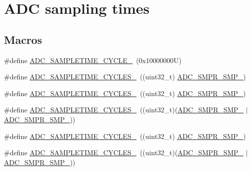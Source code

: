 \hypertarget{group___a_d_c__sampling__times}{}\section{A\+DC sampling times}
\label{group___a_d_c__sampling__times}
\subsection*{Macros}
\begin{DoxyCompactItemize}
\item 
\#define \hyperlink{group___a_d_c__sampling__times_ga01ae8ddd4c3f0a7cace13273c1e67fdd}{A\+D\+C\+\_\+\+S\+A\+M\+P\+L\+E\+T\+I\+M\+E\+\_\+C\+Y\+C\+L\+E\+\_}~(0x10000000\+U)
\item 
\#define \hyperlink{group___a_d_c__sampling__times_gac0aff040aa3a0e63147fcdd8ab805af1}{A\+D\+C\+\_\+\+S\+A\+M\+P\+L\+E\+T\+I\+M\+E\+\_\+C\+Y\+C\+L\+E\+S\+\_}~((uint32\+\_\+t) \hyperlink{group___peripheral___registers___bits___definition_ga694f8b1e1e5410a1a60484f4857b8b2d}{A\+D\+C\+\_\+\+S\+M\+P\+R\+\_\+\+S\+M\+P\+\_})
\item 
\#define \hyperlink{group___a_d_c__sampling__times_ga96ddc2c8f5aec56ef5b6dc7cf908842a}{A\+D\+C\+\_\+\+S\+A\+M\+P\+L\+E\+T\+I\+M\+E\+\_\+C\+Y\+C\+L\+E\+S\+\_}~((uint32\+\_\+t) \hyperlink{group___peripheral___registers___bits___definition_gab57bf329f4bf7c460f3666ea37dc7221}{A\+D\+C\+\_\+\+S\+M\+P\+R\+\_\+\+S\+M\+P\+\_})
\item 
\#define \hyperlink{group___a_d_c__sampling__times_ga2fb67421195d0c9f1edb705dcfcd754f}{A\+D\+C\+\_\+\+S\+A\+M\+P\+L\+E\+T\+I\+M\+E\+\_\+C\+Y\+C\+L\+E\+S\+\_}~((uint32\+\_\+t)(\hyperlink{group___peripheral___registers___bits___definition_gab57bf329f4bf7c460f3666ea37dc7221}{A\+D\+C\+\_\+\+S\+M\+P\+R\+\_\+\+S\+M\+P\+\_} $\vert$ \hyperlink{group___peripheral___registers___bits___definition_ga694f8b1e1e5410a1a60484f4857b8b2d}{A\+D\+C\+\_\+\+S\+M\+P\+R\+\_\+\+S\+M\+P\+\_}))
\item 
\#define \hyperlink{group___a_d_c__sampling__times_ga190357836133681e150ddc7242151661}{A\+D\+C\+\_\+\+S\+A\+M\+P\+L\+E\+T\+I\+M\+E\+\_\+C\+Y\+C\+L\+E\+S\+\_}~((uint32\+\_\+t) \hyperlink{group___peripheral___registers___bits___definition_ga046d9b1e209acb9e7152db85c8b7bcce}{A\+D\+C\+\_\+\+S\+M\+P\+R\+\_\+\+S\+M\+P\+\_})
\item 
\#define \hyperlink{group___a_d_c__sampling__times_ga4ea55e3a10a04630820387755f4f448a}{A\+D\+C\+\_\+\+S\+A\+M\+P\+L\+E\+T\+I\+M\+E\+\_\+C\+Y\+C\+L\+E\+S\+\_}~((uint32\+\_\+t)(\hyperlink{group___peripheral___registers___bits___definition_ga046d9b1e209acb9e7152db85c8b7bcce}{A\+D\+C\+\_\+\+S\+M\+P\+R\+\_\+\+S\+M\+P\+\_} $\vert$ \hyperlink{group___peripheral___registers___bits___definition_ga694f8b1e1e5410a1a60484f4857b8b2d}{A\+D\+C\+\_\+\+S\+M\+P\+R\+\_\+\+S\+M\+P\+\_}))

\end{DoxyCompactItemize}
